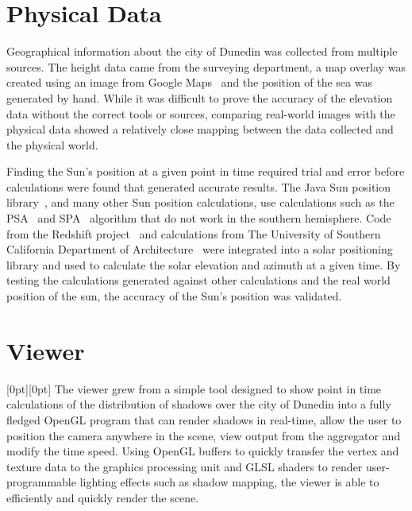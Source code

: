 \documentclass[12pt]{report}
\newcommand{\note}[1]{\raisebox{0pt}[0pt][0pt]{\pdfcomment[open=true]{#1}}}
\begin{document}
\section{Physical Data}
Geographical information about the city of Dunedin was collected from multiple sources. The height data came from the surveying department, a map overlay was created using an image from Google Maps~\cite{gmaps} and the position of the sea was generated by hand. While it was difficult to prove the accuracy of the elevation data without the correct tools or sources, comparing real-world images with the physical data showed a relatively close mapping between the data collected and the physical world.

Finding the Sun's position at a given point in time required trial and error before calculations were found that generated accurate results. The Java Sun position library~\cite{javasunlib}, and many other Sun position calculations, use calculations such as the PSA~\cite{psa} and SPA~\cite{spa} algorithm that do not work in the southern hemisphere\cite{southsun}. Code from the Redshift project~\cite{redshift} and calculations from The University of Southern California Department of Architecture~\cite{solarazi} were integrated into a solar positioning library and used to calculate the solar elevation and azimuth at a given time. By testing the calculations generated against other calculations and the real world position of the sun, the accuracy of the Sun's position was validated.


\section{Viewer}\note{Should I change these headings?}
The viewer grew from a simple tool designed to show point in time calculations of the distribution of shadows over the city of Dunedin into a fully fledged OpenGL program that can render shadows in real-time, allow the user to position the camera anywhere in the scene, view output from the aggregator and modify the time speed. Using OpenGL buffers to quickly transfer the vertex and texture data to the graphics processing unit and GLSL shaders to render user-programmable lighting effects such as shadow mapping, the viewer is able to efficiently and quickly render the scene.
\end{document}
